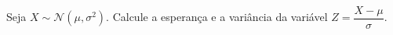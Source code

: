 %
%


\begin{exercicioBanco}[\valorquestao]
    Seja \(X \sim \mathcal{N}(\mu,\sigma^{2})\). Calcule a esperança e a variância da variável \(Z = \dfrac{X - \mu}{\sigma}\).
\end{exercicioBanco}

